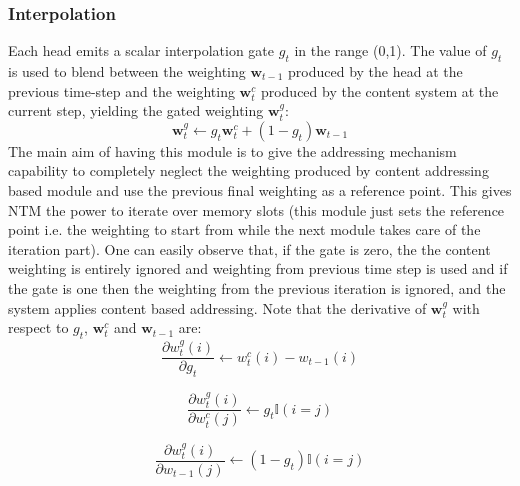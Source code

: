 \subsubsection{Interpolation}
Each head emits a scalar interpolation gate $g_t$ in the range (0,1). The value of $g_t$ is used to blend between the weighting $\textbf{w}_{t-1}$ produced by the head at the previous time-step and the weighting $\textbf{w}_t^c$ produced by the content system at the current step, yielding the gated weighting $\textbf{w}_t^g$:
\begin{equation}
\textbf{w}_t^g \leftarrow g_t\textbf{w}_t^c + (1-g_t)\textbf{w}_{t-1}
\end{equation}
\noindent
The main aim of having this module is to give the addressing mechanism capability to completely neglect the weighting produced by content addressing based module and use the previous final weighting as a reference point.
This gives NTM the power to iterate over memory slots (this module just sets the reference point i.e. the weighting to start from while the next module takes care of the iteration part). One can easily observe that, if the gate is zero, the the content weighting is entirely ignored and weighting from previous time step is used and if the gate is one then the weighting from the previous iteration is ignored, and the system applies content based addressing. Note that the derivative of $\textbf{w}_t^g$ with respect to $g_t$, $\textbf{w}_t^c$ and $\textbf{w}_{t-1}$ are:
\begin{equation}
\frac{\partial w_t^g(i)}{\partial g_t} \leftarrow w_t^c(i)-w_{t-1}(i)
\end{equation}

\begin{equation}
\frac{\partial w_t^g(i)}{\partial w_t^c(j)} \leftarrow g_t\mathbb{I}(i=j)
\end{equation}

\begin{equation}
\frac{\partial w_t^g(i)}{\partial w_{t-1}(j)} \leftarrow (1-g_t)\mathbb{I}(i=j)
\end{equation}

